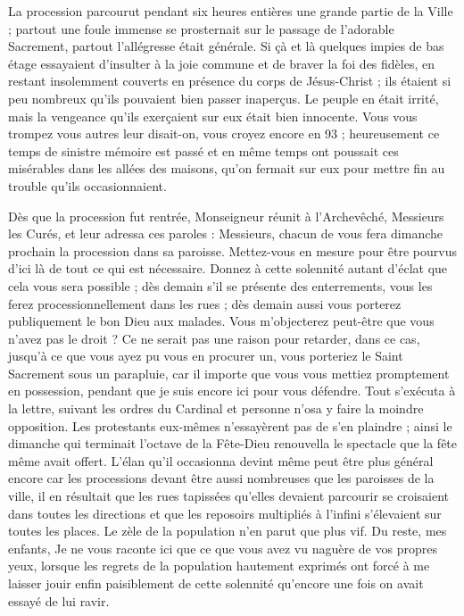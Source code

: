 \documentclass[11pt,a4paper]{report}
\begin{document}
La procession parcourut pendant six heures entières une grande partie de la Ville ; partout une foule immense se prosternait sur le passage de l'adorable Sacrement, partout l'allégresse était générale. Si çà et là quelques impies de bas étage essayaient d'insulter à la joie commune et de braver la foi des fidèles, en restant insolemment couverts en présence du corps de Jésus-Christ ; ils étaient si peu nombreux qu'ils pouvaient bien passer inaperçus. Le peuple en était irrité, mais la vengeance qu'ils exerçaient sur eux était bien innocente. Vous vous trompez vous autres leur disait-on, vous croyez encore en 93 ; heureusement ce temps de sinistre mémoire est passé et en même temps ont poussait ces misérables dans les allées des maisons, qu'on fermait sur eux pour mettre fin au trouble qu'ils occasionnaient.

Dès que la procession fut rentrée, Monseigneur réunit à l'Archevêché, Messieurs les Curés, et leur adressa ces paroles : Messieurs, chacun de vous fera dimanche prochain la procession dans sa paroisse. Mettez-vous en mesure pour être pourvus d'ici là de tout ce qui est nécessaire. Donnez à cette solennité autant d'éclat que cela vous sera possible ; dès demain s'il se présente des enterrements, vous les ferez processionnellement dans les rues ; dès demain aussi vous porterez publiquement le bon Dieu aux malades. Vous m'objecterez peut-être que vous n'avez pas le droit ? Ce ne serait pas une raison pour retarder, dans ce cas, jusqu'à ce que vous ayez pu vous en procurer un, vous porteriez le Saint Sacrement sous un parapluie, car il importe que vous vous mettiez promptement en possession, pendant que je suis encore ici pour vous défendre. Tout s'exécuta à la lettre, suivant les ordres du Cardinal et personne n'osa y faire la moindre opposition. Les protestants eux-mêmes n'essayèrent pas de s'en plaindre ; ainsi le dimanche qui terminait l'octave de la Fête-Dieu renouvella le spectacle que la fête même avait offert. L'élan qu'il occasionna devint même peut être plus général encore car les processions devant être aussi nombreuses que les paroisses de la ville, il en résultait que les rues tapissées qu'elles devaient parcourir se croisaient dans toutes les directions et que les reposoirs multipliés à l'infini s'élevaient sur toutes les places. Le zèle de la population n'en parut que plus vif. Du reste, mes enfants, Je ne vous raconte ici que ce que vous avez vu naguère de vos propres yeux, lorsque les regrets de la population hautement exprimés ont forcé à me laisser jouir enfin paisiblement de cette solennité qu'encore une fois on avait essayé de lui ravir.
\end{document}
